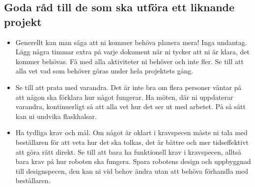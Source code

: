 \documentclass[a4paper,12pt]{article}
\begin{document}
\subsection{Goda råd till de som ska utföra ett liknande projekt}
\begin{itemize}
\item Generellt kan man säga att ni kommer behöva planera mera! Inga undantag.
Lägg några timmar extra på varje dokument när ni tycker att ni är klara, det
kommer behövas. Få med alla aktiviteter ni behöver och inte fler. Se till att
alla vet vad som behöver göras under hela projektets gång.
\item Se till att prata med varandra. Det är inte bra om flera personer väntar
på att någon ska förklara hur något fungerar. Ha möten, där ni uppdaterar
varandra, kontinuerligt så att alla vet hur det ser ut med arbetet. På så sätt
kan ni undvika flaskhalsar.
\item Ha tydliga krav och mål. Om något är oklart i kravspecen måste ni tala med
beställaren för att veta hur det ska tolkas, det är bättre och mer tidseffektivt
att göra rätt direkt. Se till att bara ha funktionell krav i kravspecen, alltså
bara krav på hur roboten ska fungera. Spara robotens design och uppbyggnad till
designspecen, den kan ni vid behov ändra utan att behöva förhandla med
beställaren. 
\end{itemize}
\end{document}
